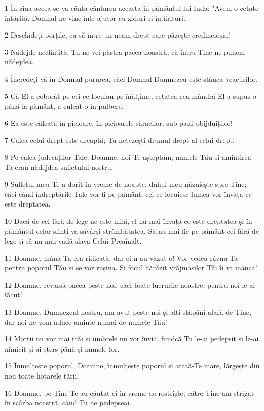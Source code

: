 \par 1 În ziua aceea se va cânta cântarea aceasta în pământul lui Iuda: "Avem o cetate întărită. Domnul ne vine într-ajutor cu ziduri și întărituri.
\par 2 Deschideți porțile, ca să intre un neam drept care păzește credincioșia!
\par 3 Nădejde neclintită, Tu ne vei păstra pacea noastră, că întru Tine ne punem nădejdea.
\par 4 Încredeți-vă în Domnul pururea, căci Domnul Dumnezeu este stânca veacurilor.
\par 5 Că El a coborât pe cei ce locuiau pe înălțime, cetatea cea mândră El a supus-o până la pământ, a culcat-o în pulbere.
\par 6 Ea este călcată în picioare, în picioarele săracilor, sub pașii obijduiților!
\par 7 Calea celui drept este dreaptă; Tu netezești drumul drept al celui drept.
\par 8 Pe calea judecăților Tale, Doamne, noi Te așteptăm; numele Tău și amintirea Ta erau nădejdea sufletului nostru.
\par 9 Sufletul meu Te-a dorit în vreme de noapte, duhul meu năzuiește spre Tine; căci când îndreptările Tale vor fi pe pământ, cei ce locuiesc lumea vor învăța ce este dreptatea.
\par 10 Dacă de cel fără de lege ne este milă, el nu mai învață ce este dreptatea și în pământul celor sfinți va săvârși strâmbătatea. Să nu mai fie pe pământ cei fără de lege și să nu mai vadă slava Celui Preaînalt.
\par 11 Doamne, mâna Ta era ridicată, dar ei n-au văzut-o! Vor vedea râvna Ta pentru poporul Tău și se vor rușina. Și focul hărăzit vrăjmașilor Tăi îi va mânca!
\par 12 Doamne, revarsă pacea peste noi, căci toate lucrurile noastre, pentru noi le-ai făcut!
\par 13 Doamne, Dumnezeul nostru, am avut peste noi și alți stăpâni afară de Tine, dar noi ne vom aduce aminte numai de numele Tău!
\par 14 Morții nu vor mai trăi și umbrele nu vor învia, fiindcă Tu le-ai pedepsit și le-ai nimicit și ai șters până și numele lor.
\par 15 Înmulțește poporul, Doamne, înmulțește poporul și arată-Te mare, lărgește din nou toate hotarele țării!
\par 16 Doamne, pe Tine Te-au căutat ei în vreme de restriște, către Tine am strigat în scârba noastră, când Tu ne pedepseai.
